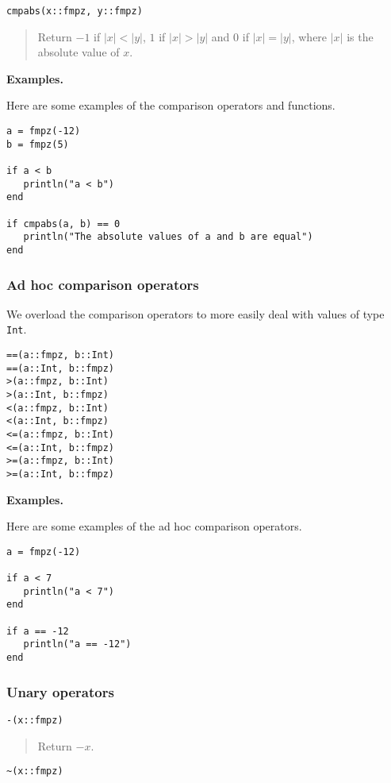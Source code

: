 \documentclass[a4paper,10pt]{article}
\newcommand{\code}{\lstinline}
\newcommand{\desc}[1]{\vspace{-3mm}\begin{quote}#1\end{quote}}
\begin{document}
{{\begin{lstlisting}
cmpabs(x::fmpz, y::fmpz)
\end{lstlisting}

\desc{Return $-1$ if $|x| < |y|$, $1$ if $|x| > |y|$ and $0$ if 
$|x| = |y|$, where $|x|$ is the absolute value of $x$.}

\textbf{Examples.}

Here are some examples of the comparison operators and functions.

\begin{lstlisting}
a = fmpz(-12)
b = fmpz(5)

if a < b
   println("a < b")
end

if cmpabs(a, b) == 0
   println("The absolute values of a and b are equal")
end
\end{lstlisting}

\subsubsection{Ad hoc comparison operators}

We overload the comparison operators to more easily deal with values of type \code{Int}.

\begin{lstlisting}
==(a::fmpz, b::Int)
==(a::Int, b::fmpz)
>(a::fmpz, b::Int)
>(a::Int, b::fmpz)
<(a::fmpz, b::Int)
<(a::Int, b::fmpz)
<=(a::fmpz, b::Int)
<=(a::Int, b::fmpz)
>=(a::fmpz, b::Int)
>=(a::Int, b::fmpz)
\end{lstlisting}

\textbf{Examples.}

Here are some examples of the ad hoc comparison operators.

\begin{lstlisting}
a = fmpz(-12)

if a < 7
   println("a < 7")
end

if a == -12
   println("a == -12")
end
\end{lstlisting}

\subsubsection{Unary operators}

\begin{lstlisting}
-(x::fmpz)
\end{lstlisting}

\desc{Return $-x$.}

\begin{lstlisting}
~(x::fmpz)
\end{lstlisting}

}}
\end{document}
